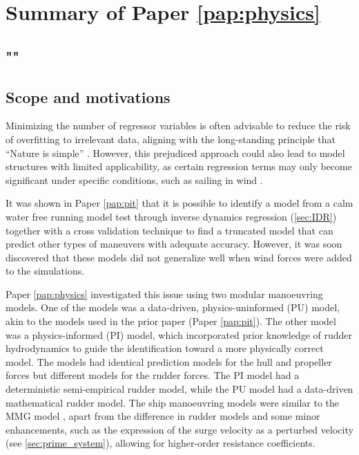 \section{Summary of Paper \ref{pap:physics}}
\subsection*{""}
\subsection*{Scope and motivations}
Minimizing the number of regressor variables is often advisable to reduce the risk of overfitting to irrelevant data, aligning with the long-standing principle that ``Nature is simple'' \cite{ljungPerspectivesSystemIdentification2010}. However, this prejudiced approach could also lead to model structures with limited applicability, as certain regression terms may only become significant under specific conditions, such as sailing in wind \cite{abkowitzMEASUREMENTHYDRODYNAMICCHARACTERISTICS1980}.

It was shown in Paper \ref{pap:pit} that it is possible to identify a model from a calm water free running model test through inverse dynamics regression (\autoref{sec:IDR}) together with a cross validation technique to find a truncated model that can predict other types of maneuvers with adequate accuracy. However, it was soon discovered that these models did not generalize well when wind forces were added to the simulations. 

Paper \ref{pap:physics}  investigated this issue using two modular manoeuvring models. One of the models was a data-driven, physics-uninformed (PU) model, akin to the models used in the prior paper (Paper \ref{pap:pit}).
The other model was a physics-informed (PI) model, which incorporated prior knowledge of rudder hydrodynamics to guide the identification toward a more physically correct model. 
The models had identical prediction models for the hull and propeller forces but different models for the rudder forces. The PI model had a deterministic semi-empirical rudder model, while the PU model had a data-driven mathematical rudder model. The ship manoeuvring models were similar to the MMG model \cite{yasukawaIntroductionMMGStandard2015}, apart from the difference in rudder models and some minor enhancements, such as the expression of the surge velocity as a perturbed velocity (see \autoref{sec:prime_system}), allowing for higher-order resistance coefficients.

